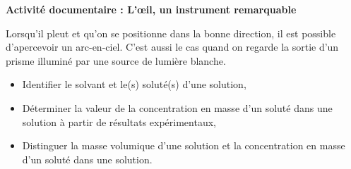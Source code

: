 \modeCorrection

\renewcommand{\thesubsection}{\textcolor{red}{\Roman{section}.\arabic{subsection}}}
\renewcommand{\thesubsubsection}{\textcolor{red}{\Roman{section}.\arabic{subsection}.\alph{subsubsection}}}

\setcounter{section}{0}
\setcounter{document}{0}
\sndEnTeteActDeux

\begin{center}
\begin{mdframed}[style=titr, leftmargin=60pt, rightmargin=60pt, innertopmargin=7pt, innerbottommargin=7pt, innerrightmargin=8pt, innerleftmargin=8pt]

\begin{center}
\large{\textbf{Activité documentaire : L'\oe il, un instrument remarquable}}
\end{center}

\end{mdframed}
\end{center}

\begin{tcolorbox}[colback=orange!5!white,colframe=orange!75!black,title= Contexte de l'activité]
Lorsqu'il pleut et qu'on se positionne dans la bonne direction, il est possible d'apercevoir un arc-en-ciel. C'est aussi le cas quand on regarde la sortie d'un prisme illuminé par une source de lumière blanche.
\end{tcolorbox}
\begin{tcolorbox}[colback=blue!5!white,colframe=blue!75!black,title=Objectifs :]
\begin{itemize}
    \item Identifier le solvant et le(s) soluté(s) d’une solution,
    \item Déterminer la valeur de la concentration en masse d’un soluté dans une solution à partir de résultats expérimentaux,
    \item Distinguer la masse volumique d’une solution et la concentration en masse d’un soluté dans une solution.
\end{itemize}
\end{tcolorbox}

   
